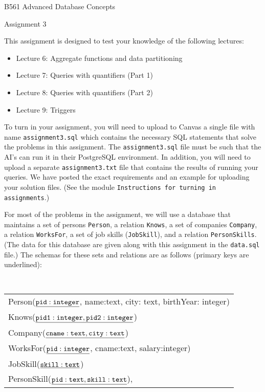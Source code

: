 \documentclass{article}
\begin{document}
\centerline{\Large B561 Advanced Database Concepts}
\medskip
\centerline{\Large Assignment 3}

\medskip
\medskip

This assignment is designed to test your knowledge of the following lectures:
\begin{itemize}
\item Lecture 6:  Aggregate functions and data partitioning
\item Lecture 7:  Queries with quantifiers (Part 1)
\item Lecture 8:  Queries with quantifiers (Part 2)
\item Lecture 9:  Triggers
\end{itemize}

To turn in your assignment, you will need to upload to Canvas a single file with name {\tt assignment3.sql} which contains 
the necessary SQL statements that solve the problems in this assignment.   
The {\tt assignment3.sql} file must be such that the AI's can run it in their PostgreSQL environment.  
In addition, you will need to upload a separate {\tt assignment3.txt} file that contains the results of running
your queries.
We have posted the exact requirements and an example for uploading your solution files.  (See the module
{\tt Instructions for turning in assignments}.)

For most of the problems in the assignment, we will use a database
that maintains a set of persons {\tt Person}, a relation {\tt Knows}, a set of companies {\tt Company}, a relation {\tt WorksFor}, 
a set of job skills ({\tt JobSkill}), and a relation {\tt PersonSkills}.   
(The data for this database are given along with this assignment 
in the {\tt data.sql} file.)
The schemas for these sets and relations are as follows (primary keys are underlined):

{\small
\begin{center}
{\tt
  \begin{tabular}{l}
  {Person}($\underline{\tt pid: integer}$, name:text, city: text, birthYear: integer)\\
  {Knows}($\underline{\tt pid1:integer, pid2:integer}$) \\
  {Company}($\underline{\tt cname:text,  city:text}$) \\
  {WorksFor}($\underline{\tt pid: integer}$, cname:text, salary:integer) \\
   {JobSkill}($\underline{\tt skill:text }$) \\
  {PersonSkill}($\underline{\tt pid: text, skill:text}$),\\
  \end{tabular}
  }
\end{center}
}
\end{document}
